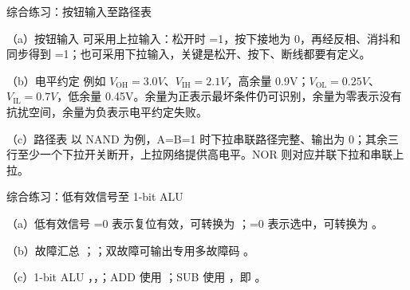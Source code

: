 \begin{chapteranswer}{综合练习：按钮输入至路径表}
\begin{answersubproblem}{（a）按钮输入}
可采用上拉输入：松开时 =1，按下接地为 0，再经反相、消抖和同步得到 =1；也可采用下拉输入，关键是松开、按下、断线都要有定义。
\end{answersubproblem}
\begin{answersubproblem}{（b）电平约定}
例如 $V_\mathrm{OH}=3.0V$、$V_\mathrm{IH}=2.1V$，高余量 0.9V；$V_\mathrm{OL}=0.25V$、$V_\mathrm{IL}=0.7V$，低余量 0.45V。余量为正表示最坏条件仍可识别，余量为零表示没有抗扰空间，余量为负表示电平约定失败。
\end{answersubproblem}
\begin{answersubproblem}{（c）路径表}
以 NAND 为例，A=B=1 时下拉串联路径完整、输出为 0；其余三行至少一个下拉开关断开，上拉网络提供高电平。NOR 则对应并联下拉和串联上拉。
\end{answersubproblem}
\end{chapteranswer}

\begin{chapteranswer}{综合练习：低有效信号至 1-bit ALU}
\begin{answersubproblem}{（a）低有效信号}
=0 表示复位有效，可转换为 ；=0 表示选中，可转换为 。
\end{answersubproblem}
\begin{answersubproblem}{（b）故障汇总}
；；双故障可输出专用多故障码 。
\end{answersubproblem}
\begin{answersubproblem}{（c）1-bit ALU}
，，；ADD 使用 ；SUB 使用 ，即 。
\end{answersubproblem}
\end{chapteranswer}

